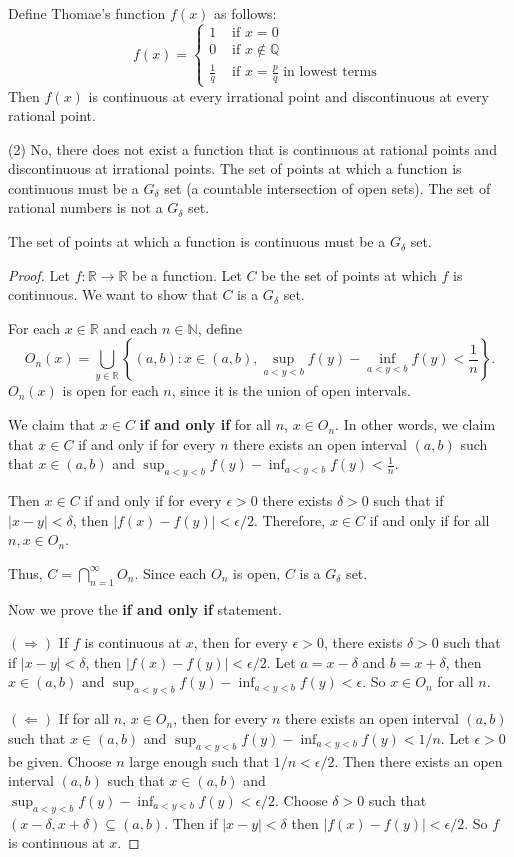 \begin{example}
Define Thomae's function $f(x)$ as follows:
\[
f(x)= \begin{cases}1 & \text { if } x=0 \\ 0 & \text { if } x \notin \mathbb{Q} \\ \frac{1}{q} & \text { if } x=\frac{p}{q} \text { in lowest terms }\end{cases}
\]Then $f(x)$ is continuous at every irrational point and discontinuous at every rational point.
\end{example}
(2) No, there does not exist a function that is continuous at rational points and discontinuous at irrational points. The set of points at which a function is continuous must be a $G_\delta$ set (a countable intersection of open sets). The set of rational numbers is not a $G_\delta$ set.

\begin{theorem}
The set of points at which a function is continuous must be a $G_\delta$ set.
\end{theorem}
\begin{proof}
Let $f: \mathbb{R} \rightarrow \mathbb{R}$ be a function. Let $C$ be the set of points at which $f$ is continuous. We want to show that $C$ is a $G_\delta$ set.

For each $x \in \mathbb{R}$ and each $n \in \mathbb{N}$, define
\[
O_n(x)=\bigcup_{y \in \mathbb{R}}\left\{(a, b): x \in(a, b), \sup _{a<y<b} f(y)-\inf _{a<y<b} f(y)<\frac{1}{n}\right\} .
\]
$O_n(x)$ is open for each $n$, since it is the union of open intervals.

We claim that $x \in C$ \textbf{if and only if} for all $n$, $x \in O_n$. In other words, we claim that $x \in C$ if and only if for every $n$ there exists an open interval $(a,b)$ such that $x \in (a,b)$ and $\sup_{a<y<b}f(y)-\inf_{a<y<b}f(y) < \frac{1}{n}$.

Then $x \in C$ if and only if for every $\epsilon>0$ there exists $\delta>0$ such that if $|x-y|<\delta$, then $|f(x)-f(y)|<\epsilon / 2$. Therefore, $x \in C$ if and only if for all $n, x \in O_n$.

Thus, $C=\bigcap_{n=1}^{\infty} O_n$. Since each $O_n$ is open, $C$ is a $G_\delta$ set.

Now we prove the \textbf{if and only if} statement.

$(\Rightarrow)$ If $f$ is continuous at $x$, then for every $\epsilon>0$, there exists $\delta>0$ such that if $|x-y|<\delta$, then $|f(x)-f(y)|<\epsilon / 2$. Let $a=x-\delta$ and $b=x+\delta$, then $x \in(a, b)$ and $\sup _{a<y<b} f(y)-\inf _{a<y<b} f(y)<\epsilon$. So $x \in O_n$ for all $n$.

$(\Leftarrow)$ If for all $n$, $x \in O_n$, then for every $n$ there exists an open interval $(a, b)$ such that $x \in(a, b)$ and $\sup _{a<y<b} f(y)-\inf _{a<y<b} f(y)<1 / n$. Let $\epsilon>0$ be given. Choose $n$ large enough such that $1 / n<\epsilon / 2$. Then there exists an open interval $(a, b)$ such that $x \in(a, b)$ and $\sup _{a<y<b} f(y)-\inf _{a<y<b} f(y)<\epsilon / 2$. Choose $\delta>0$ such that $(x-\delta, x+\delta) \subseteq(a, b)$. Then if $|x-y|<\delta$ then $|f(x)-f(y)|<\epsilon / 2$. So $f$ is continuous at $x$.
\end{proof}

